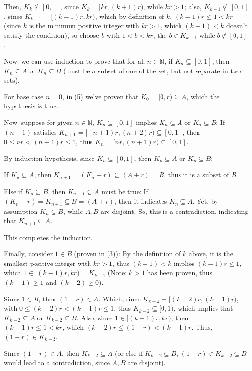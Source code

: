 \documentclass{article}
\begin{document}
Then, $K_k \not\subseteq [0,1]$, since $K_k=[kr,(k+1)r)$, while $kr >1$; also, $K_{k-1}\not\subseteq [0,1]$, since $K_{k-1}=[(k-1)r,kr)$, which by definition of $k$, $(k-1)r \leq 1 < kr$ (since $k$ is the minimum positive integer with $kr>1$, which $(k-1)<k$ doesn't satisfy the condition), so choose $b$ with $1<b<kr$, the $b\in K_{k-1}$ while $b\notin [0,1]$.

\hfill

Now, we can use induction to prove that for all $n\in\mathbb{N}$, if $K_n\subseteq [0,1]$, then $K_n\subseteq A$ or $K_n \subseteq B$ (must be a subset of one of the set, but not separate in two sets).

For base case $n=0$, in (5) we've proven that $K_0=[0,r) \subseteq A$, which the hypothesis is true.

Now, suppose for given $n\in\mathbb{N}$, $K_n\subseteq [0,1]$ implies $K_n\subseteq A$ or $K_n \subseteq B$: If $(n+1)$ satisfies $K_{n+1}=[(n+1)r,(n+2)r)\subseteq [0,1]$, then $0 \leq nr < (n+1)r \leq 1$, thus $K_n = [nr,(n+1)r)\subseteq [0,1]$.

By induction hypothesis, since $K_n\subseteq [0,1]$, then $K_n\subseteq A$ or $K_n\subseteq B$:

If $K_n\subseteq A$, then $K_{n+1}=(K_n+r)\subseteq (A+r) = B$, thus it is a subset of $B$.

Else if $K_n \subseteq B$, then $K_{n+1}\subseteq A$ must be true: If $(K_n+r)=K_{n+1}\subseteq B=(A+r)$, then it indicates $K_n\subseteq A$. Yet, by assumption $K_n\subseteq B$, while $A,B$ are disjoint. So, this is a contradiction, indicating that $K_{n+1}\subseteq A$.

This completes the induction.

\hfill

Finally, consider $1\in B$ (proven in (3)): By the definition of $k$ above, it is the smallest positive integer with $kr >1$, thus $(k-1)<k$ implies $(k-1)r \leq 1$, which $1 \in [(k-1)r,kr) = K_{k-1}$ (Note: $k>1$ has been proven, thus $(k-1)\geq 1$ and $(k-2)\geq 0$).

Since $1\in B$, then $(1-r)\in A$. Which, since $K_{k-2}=[(k-2)r, (k-1)r)$, with $0 \leq (k-2)r < (k-1)r \leq 1$, thus $K_{k-2}\subseteq [0,1)$, which implies that $K_{k-2}\subseteq A$ or $K_{k-2}\subseteq B$. Also, since $1\in [(k-1)r,kr)$, then $(k-1)r\leq 1 < kr$, which $(k-2)r \leq (1-r) < (k-1)r$. Thus, $(1-r) \in K_{k-2}$.

Since $(1-r)\in A$, then $K_{k-2}\subseteq A$ (or else if $K_{k-2}\subseteq B$, $(1-r)\in K_{k-2}\subseteq B$ would lead to a contradiction, since $A,B$ are disjoint).
\end{document}
